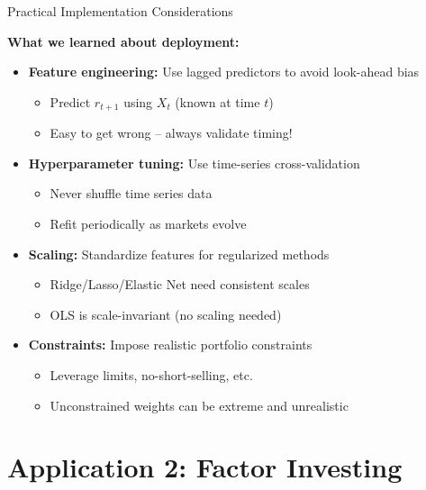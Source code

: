 \documentclass[10pt]{beamer}
\begin{document}
\begin{frame}{Practical Implementation Considerations}
  
  \textbf{What we learned about deployment:}
  
  \vspace{0.5em}
  \begin{itemize}
    \item \textbf{Feature engineering:} Use lagged predictors to avoid look-ahead bias
    \begin{itemize}
      \item Predict $r_{t+1}$ using $X_t$ (known at time $t$)
      \item Easy to get wrong -- always validate timing!
    \end{itemize}
    
    \vspace{0.5em}
    \item \textbf{Hyperparameter tuning:} Use time-series cross-validation
    \begin{itemize}
      \item Never shuffle time series data
      \item Refit periodically as markets evolve
    \end{itemize}
    
    \vspace{0.5em}
    \item \textbf{Scaling:} Standardize features for regularized methods
    \begin{itemize}
      \item Ridge/Lasso/Elastic Net need consistent scales
      \item OLS is scale-invariant (no scaling needed)
    \end{itemize}
    
    \vspace{0.5em}
    \item \textbf{Constraints:} Impose realistic portfolio constraints
    \begin{itemize}
      \item Leverage limits, no-short-selling, etc.
      \item Unconstrained weights can be extreme and unrealistic
    \end{itemize}
  \end{itemize}
\end{frame}

\section{Application 2: Factor Investing}
\end{document}
